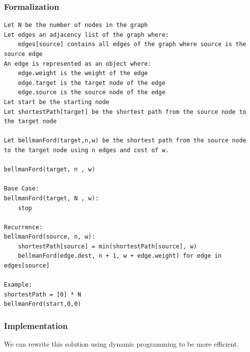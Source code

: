 \documentclass[11pt,oneside]{book}
\begin{document}
\subsubsection{Formalization}

\begin{lstlisting}
Let N be the number of nodes in the graph
Let edges an adjacency list of the graph where:
    edges[source] contains all edges of the graph where source is the source edge
An edge is represented as an object where:
    edge.weight is the weight of the edge
    edge.target is the target node of the edge
    edge.source is the source node of the edge
Let start be the starting node
Let shortestPath[target] be the shortest path from the source node to the target node

Let bellmanFord(target,n,w) be the shortest path from the source node to the target node using n edges and cost of w.

bellmanFord(target, n , w)

Base Case:
bellmanFord(target, N , w):
    stop

Recurrence:
bellmanFord(source, n, w):
    shortestPath[source] = min(shortestPath[source], w)
    bellmanFord(edge.dest, n + 1, w + edge.weight) for edge in edges[source]

Example:
shortestPath = [0] * N
bellmanFord(start,0,0)
\end{lstlisting}

\subsubsection{Implementation}

We can rewrite this solution using dynamic programming to be more efficient.
\end{document}
